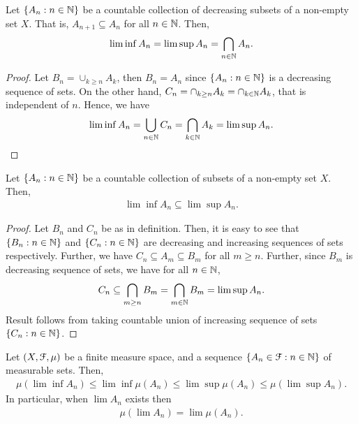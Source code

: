 \documentclass[a4paper,english,12pt]{article}
\begin{document}
\begin{prop}\label{Prop:DecreasingSet} Let $\{A_n: n \in \mathbb{N}\}$ be a countable collection of decreasing subsets of a non-empty set $X$. That is, $A_{n+1} \subseteq A_{n}$ for all $n \in \mathbb{N}$. Then,
\begin{align*}
\lim\inf A_n = \lim\sup A_n = \bigcap_{n \in \mathbb{N}} A_n.
\end{align*}
\end{prop}
\begin{proof} Let $B_n = \cup_{k \geq n}A_k$, then $B_n = A_n$ since $\{A_n: n \in \mathbb{N}\}$ is a decreasing sequence of sets.  On the other hand, $C_n = \cap_{k \geq n}A_k = \cap_{k \in \mathbb{N}}A_k$, that is independent of $n$. Hence, we have 
\begin{align*}
\lim\inf A_n = \bigcup_{n \in \mathbb{N}}C_n = \bigcap_{k \in \mathbb{N}}A_k = \lim\sup A_n.
\end{align*}
\end{proof}
\begin{prop} Let $\{A_n: n \in \mathbb{N}\}$ be a countable collection of subsets of a non-empty set $X$. Then,
\begin{align*}
\lim\inf A_n \subseteq \lim\sup A_n.
\end{align*}
\end{prop}
\begin{proof} Let $B_n$ and $C_n$ be as in definition. Then, it is easy to see that $\{B_n: n \in \mathbb{N}\}$ and $\{C_n: n \in \mathbb{N}\}$ are decreasing and increasing sequences of sets respectively. Further, we have $C_n \subseteq A_m \subseteq B_m$ for all $m \geq n$. Further, since $B_m$ is decreasing sequence of sets, we have for all $n \in \mathbb{N}$,
\begin{align*}
C_n \subseteq \bigcap_{m \geq n} B_m = \bigcap_{m \in \mathbb{N}} B_m = \lim\sup A_n.
\end{align*}
Result follows from taking countable union of increasing sequence of sets $\{C_n: n \in \mathbb{N}\}$.
\end{proof}

\begin{lem} Let $(X, \mathcal{F}, \mu)$ be a finite measure space, and a sequence $\{A_n \in \mathcal{F}: n \in \mathbb{N}\}$ of measurable sets. Then, 
\begin{align*}
\mu(\lim\inf A_n) \leq \lim\inf \mu(A_n) \leq \lim\sup \mu(A_n) \leq \mu(\lim\sup A_n).
\end{align*}
In particular, when $\lim A_n$ exists then 
\begin{align*}
\mu(\lim A_n) = \lim \mu(A_n).
\end{align*}
\end{lem}
\end{document}
